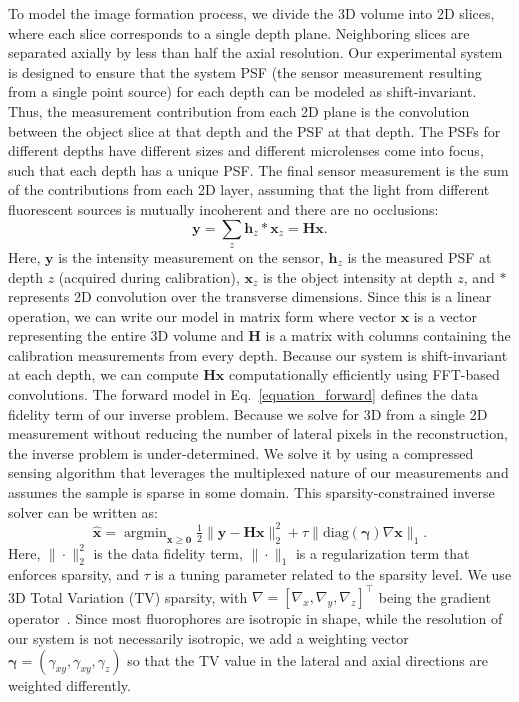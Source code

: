\documentclass{osa-article}
\DeclareMathOperator*{\argmin}{argmin}
\begin{document}
To model the image formation process, we divide the 3D volume into 2D slices, where each slice corresponds to a single depth plane. Neighboring slices are separated axially by less than half the axial resolution.  Our experimental system is designed to ensure that the system PSF (the sensor measurement resulting from a single point source) for each depth can be modeled as shift-invariant. Thus, the measurement contribution from each 2D plane is the convolution between the object slice at that depth and the PSF at that depth. The PSFs for different depths have different sizes and different microlenses come into focus, such that each depth has a unique PSF. The final sensor measurement is the sum of the contributions from each 2D layer, assuming that the light from different fluorescent sources is mutually incoherent and there are no occlusions:
\begin{equation}
    \mathbf{y} = \sum_z \mathbf{h}_z * \mathbf{x}_z = \mathbf{Hx}.
    \label{equation_forward}
\end{equation}
Here, $\mathbf{y}$ is the intensity measurement on the sensor, $\mathbf{h}_z$ is the measured PSF at depth $z$ (acquired during calibration), $\mathbf{x}_z$ is the object intensity at depth $z$, and $*$ represents 2D convolution over the transverse dimensions. Since this is a linear operation, we can write our model in matrix form where vector $\mathbf{x}$ is a vector representing the entire 3D volume and $\mathbf{H}$ is a matrix with columns containing the calibration measurements from every depth. Because our system is shift-invariant at each depth, we can compute $\mathbf{Hx}$ computationally efficiently using FFT-based convolutions. The forward model in Eq.~\ref{equation_forward} defines the data fidelity term of our inverse problem. Because we solve for 3D from a single 2D measurement without reducing the number of lateral pixels in the reconstruction, the inverse problem is under-determined. We solve it by using a compressed sensing algorithm that leverages the multiplexed nature of our measurements and assumes the sample is sparse in some domain. This sparsity-constrained inverse solver can be written as:
\begin{equation}
    \mathbf{\hat{x}}= \argmin_{\mathbf{x} \geq \mathbf{0}} \tfrac{1}{2} \big\| \mathbf{y}-\mathbf{Hx} \big\|_2^2 + \tau \big\| \mathrm{diag} (\boldsymbol{\gamma} ) \nabla { \mathbf{x}} \big\|_{1} .
    \label{eq_optimization}
\end{equation}
Here, $\| \cdot \|_2^2$ is the data fidelity term, $\| \cdot \|_{1}$ is a regularization term that enforces sparsity, and $\tau$ is a tuning parameter related to the sparsity level. We use 3D Total Variation (TV) sparsity, with $\nabla= [\nabla_x, \nabla_y, \nabla_z]^\intercal$ being the gradient operator~\cite{rudin1992tv}. Since most fluorophores are isotropic in shape, while the resolution of our system is not necessarily isotropic, we add a weighting vector ${\boldsymbol \gamma}=(\gamma_{xy},  \gamma_{xy}, \gamma_z)$ so that the TV value in the lateral and axial directions are weighted differently. 
\end{document}
